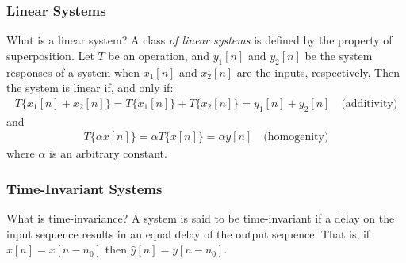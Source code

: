 \documentclass[mathserif,9pt]{beamer}
\begin{document}
\begin{frame}\frametitle{Linear Systems}\small
  \begin{block}{What is a linear system?}
    A class {\em of linear systems} is defined by the property of superposition. Let $T$ be an operation, and $y_1[n]$ and $y_2[n]$ be the system responses of a system when $x_1[n]$ and $x_2[n]$ are the inputs, respectively. Then the system is linear if, and only if: 
    \begin{align}
      T\{x_1[n] + x_2[n]\} = T\{x_1[n]\} + T\{x_2[n]\} = y_1[n] + y_2[n]  \hspace{1em} \textrm{(additivity)}
      \nonumber
    \end{align}
    and 
    \begin{align}
      T\{ \alpha x[n]\} = \alpha T\{  x[n]\} = \alpha y[n] \hspace{1em} \textrm{(homogenity)}
      \nonumber
    \end{align}
    where $\alpha$ is an arbitrary constant. 
  \end{block}
  
\end{frame}

\begin{frame}\frametitle{Time-Invariant Systems}\small
  \begin{block}{What is time-invariance?}
    A system is said to be time-invariant if a delay on the input sequence results in an equal delay of the output sequence. That is, if $\hat{x}[n] = x[n-n_0]$ then $\hat{y}[n] = y[n-n_0]$. 
  \end{block}
  
\end{frame}
\end{document}
